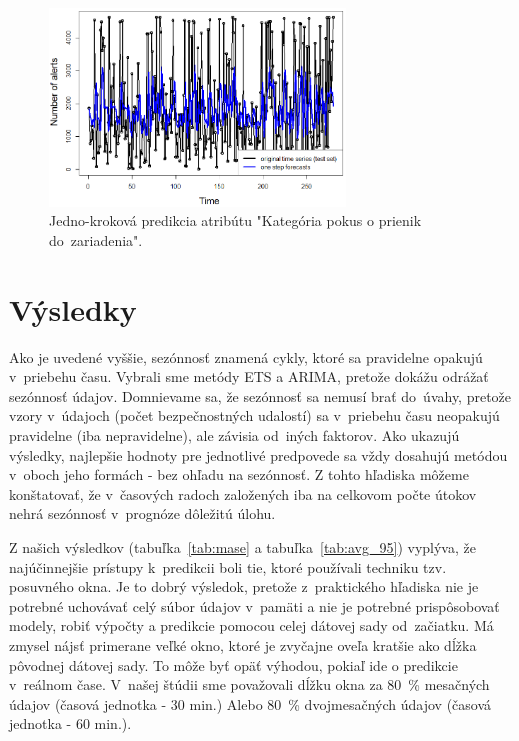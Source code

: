 \documentclass[thesismargins, thesislinespacing, openright, upjsfrontpage]{rnthesis}
\begin{document}
\begin{figure}[h]
  \centering
  \includegraphics[width=0.7\textwidth]{images/item62_1step_forecasts_new.eps}
  \caption{Jedno-kroková predikcia atribútu "Kategória pokus o prienik do~zariadenia". }
  \label{fig:forecast_attempt_exploit}
\end{figure}

\section{Výsledky}

Ako je uvedené vyššie, sezónnosť znamená cykly, ktoré sa pravidelne opakujú v~priebehu času. Vybrali sme metódy ETS a ARIMA, pretože dokážu odrážať sezónnosť údajov. Domnievame sa, že sezónnosť sa nemusí brať do~úvahy, pretože vzory v~údajoch (počet bezpečnostných udalostí) sa v~priebehu času neopakujú pravidelne (iba nepravidelne), ale závisia od~iných faktorov. Ako ukazujú výsledky, najlepšie hodnoty pre jednotlivé predpovede sa vždy dosahujú metódou v~oboch jeho formách - bez ohľadu na sezónnosť. Z tohto hľadiska môžeme konštatovať, že v~časových radoch založených iba na celkovom počte útokov nehrá sezónnosť v~prognóze dôležitú úlohu.

Z našich výsledkov (tabuľka~\ref{tab:mase} a tabuľka~\ref{tab:avg_95}) vyplýva, že najúčinnejšie prístupy k~predikcii boli tie, ktoré používali techniku tzv. posuvného okna. Je to dobrý výsledok, pretože z~praktického hľadiska nie je potrebné uchovávať celý súbor údajov v~pamäti a nie je potrebné prispôsobovať modely, robiť výpočty a predikcie pomocou celej dátovej sady od~začiatku. Má zmysel nájsť primerane veľké okno, ktoré je zvyčajne oveľa kratšie ako dĺžka pôvodnej dátovej sady. To môže byť opäť výhodou, pokiaľ ide o predikcie v~reálnom čase. V~našej štúdii sme považovali dĺžku okna za 80~\% mesačných údajov (časová jednotka - 30 min.) Alebo 80~\% dvojmesačných údajov (časová jednotka - 60 min.).
\end{document}
